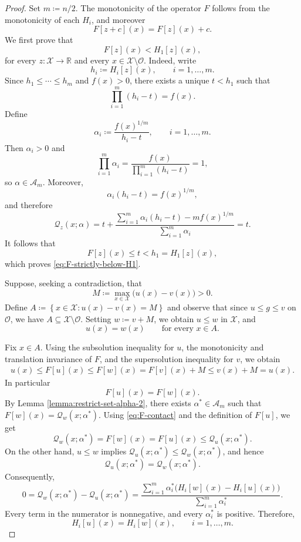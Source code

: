 \documentclass[10pt,a4paper]{amsart}
\begin{document}
\begin{proof}
Set \( m\coloneqq n/2\).  The monotonicity of the operator \(F\) follows from the monotonicity of each \(H_i\), and moreover
\begin{equation}\label{eq:F-translation}
    F[z+c](x)=F[z](x)+c.
\end{equation}
We first prove that
\begin{equation}\label{eq:F-strictly-below-H1}
    F[z](x)<H_1[z](x),
\end{equation}
for every \(z\colon\mathcal X\to\mathbb R\) and every
\(x\in\mathcal X\setminus\mathcal O\). Indeed, write
\[
    h_i\coloneqq H_i[z](x),
    \qquad i=1,\dots,m.
\]
Since \(h_1\leq\cdots\leq h_m\) and \(f(x)>0\), there exists a unique
\(t<h_1\) such that
\[
    \prod_{i=1}^{m}(h_i-t)=f(x).
\]
Define
\[
    \alpha_i
    \coloneqq
    \frac{f(x)^{1/m}}{h_i-t},
    \qquad i=1,\dots,m.
\]
Then \(\alpha_i>0\) and
\[
    \prod_{i=1}^{m}\alpha_i
    =
    \frac{f(x)}
    {\prod_{i=1}^{m}(h_i-t)}
    =1,
\]
so \(\alpha\in\mathcal A_m\). Moreover,
\[
    \alpha_i(h_i-t)=f(x)^{1/m},
\]
and therefore
\[
\mathcal{Q}_z(x;\alpha) = t+ \frac{\sum_{i=1}^{m}\alpha_i(h_i-t) -m f(x)^{1/m}}{\sum_{i=1}^{m}\alpha_i}=t.
\]
It follows that
\[
    F[z](x)\leq t<h_1=H_1[z](x),
\]
which proves \eqref{eq:F-strictly-below-H1}.

Suppose, seeking a contradiction, that
\[
    M
    \coloneqq
    \max_{x\in\mathcal X}\bigl(u(x)-v(x)\bigr)>0.
\]
Define \(A \coloneqq \left\{x\in\mathcal X \colon u(x)-v(x)=M\right\}\) and observe that since \(u\leq g\leq v\) on \(\mathcal O\), we have \(A\subseteq\mathcal X\setminus\mathcal O\). Setting \(w\coloneqq v+M\), we obtain \(u\leq w\) in \(\mathcal X\), and
\[
    u(x)=w(x)
    \qquad\text{for every }x\in A.
\]

Fix \(x\in A\). Using the subsolution inequality for \(u\), the
monotonicity and translation invariance of \(F\), and the supersolution inequality for \(v\), we obtain
\[
\begin{aligned}
    u(x) \leq F[u](x) \leq F[w](x) = F[v](x)+M \leq v(x)+M=u(x).
\end{aligned}
\]
In particular
\begin{equation}\label{eq:F-contact}
    F[u](x)=F[w](x).
\end{equation}
By Lemma \ref{lemma:restrict-set-alpha-2}, there exists
\(\alpha^*\in\mathcal A_m\) such that \(F[w](x)=\mathcal{Q}_w(x;\alpha^*)\). Using \eqref{eq:F-contact} and the definition of \(F[u]\), we get
\[
    \mathcal{Q}_w(x;\alpha^*)
    =
    F[w](x)
    =
    F[u](x)
    \leq
    \mathcal{Q}_u(x;\alpha^*).
\]
On the other hand, \(u\leq w\) implies \(\mathcal{Q}_u(x;\alpha^*)\leq \mathcal{Q}_w(x;\alpha^*)\), and hence
\[
    \mathcal{Q}_u(x;\alpha^*)=\mathcal{Q}_w(x;\alpha^*).
\]
Consequently,
\[
    0
    =
    \mathcal{Q}_w(x;\alpha^*)-\mathcal{Q}_u(x;\alpha^*)
    =
    \frac{
        \displaystyle
        \sum_{i=1}^{m}\alpha_i^*
        \bigl(H_i[w](x)-H_i[u](x)\bigr)
    }{
        \displaystyle\sum_{i=1}^{m}\alpha_i^*
    }.
\]
Every term in the numerator is nonnegative, and every
\(\alpha_i^*\) is positive. Therefore,
\[
    H_i[u](x)=H_i[w](x),
    \qquad i=1,\dots,m.
\]


\end{proof}
\end{document}
